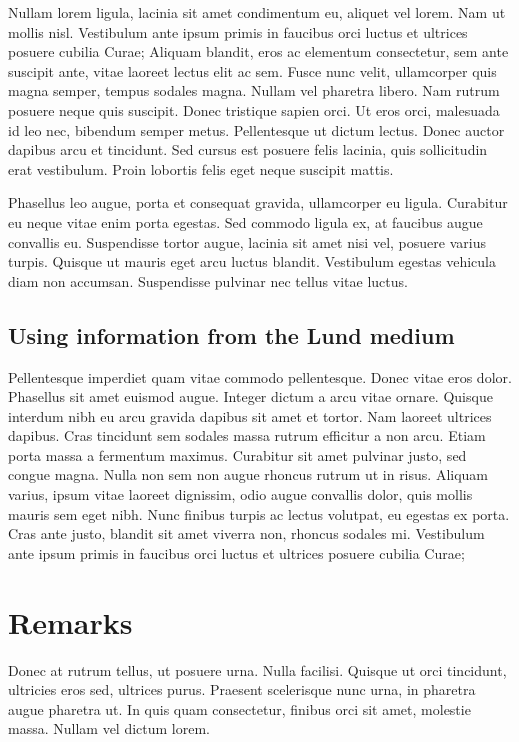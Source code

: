 \documentclass[parskip=full]{scrreprt}
\begin{document}
Nullam lorem ligula, lacinia sit amet condimentum eu, aliquet vel lorem. Nam ut mollis nisl. Vestibulum ante ipsum primis in faucibus orci luctus et ultrices posuere cubilia Curae; Aliquam blandit, eros ac elementum consectetur, sem ante suscipit ante, vitae laoreet lectus elit ac sem. Fusce nunc velit, ullamcorper quis magna semper, tempus sodales magna. Nullam vel pharetra libero. Nam rutrum posuere neque quis suscipit. Donec tristique sapien orci. Ut eros orci, malesuada id leo nec, bibendum semper metus. Pellentesque ut dictum lectus. Donec auctor dapibus arcu et tincidunt. Sed cursus est posuere felis lacinia, quis sollicitudin erat vestibulum. Proin lobortis felis eget neque suscipit mattis.

Phasellus leo augue, porta et consequat gravida, ullamcorper eu ligula. Curabitur eu neque vitae enim porta egestas. Sed commodo ligula ex, at faucibus augue convallis eu. Suspendisse tortor augue, lacinia sit amet nisi vel, posuere varius turpis. Quisque ut mauris eget arcu luctus blandit. Vestibulum egestas vehicula diam non accumsan. Suspendisse pulvinar nec tellus vitae luctus.

\section{Using information from the Lund medium}
\label{sec:lund}

Pellentesque imperdiet quam vitae commodo pellentesque. Donec vitae eros dolor. Phasellus sit amet euismod augue. Integer dictum a arcu vitae ornare. Quisque interdum nibh eu arcu gravida dapibus sit amet et tortor. Nam laoreet ultrices dapibus. Cras tincidunt sem sodales massa rutrum efficitur a non arcu. Etiam porta massa a fermentum maximus. Curabitur sit amet pulvinar justo, sed congue magna. Nulla non sem non augue rhoncus rutrum ut in risus. Aliquam varius, ipsum vitae laoreet dignissim, odio augue convallis dolor, quis mollis mauris sem eget nibh. Nunc finibus turpis ac lectus volutpat, eu egestas ex porta. Cras ante justo, blandit sit amet viverra non, rhoncus sodales mi. Vestibulum ante ipsum primis in faucibus orci luctus et ultrices posuere cubilia Curae;

\chapter{Remarks}
\label{ch:remarks}

Donec at rutrum tellus, ut posuere urna. Nulla facilisi. Quisque ut orci tincidunt, ultricies eros sed, ultrices purus. Praesent scelerisque nunc urna, in pharetra augue pharetra ut. In quis quam consectetur, finibus orci sit amet, molestie massa. Nullam vel dictum lorem. 
\end{document}
